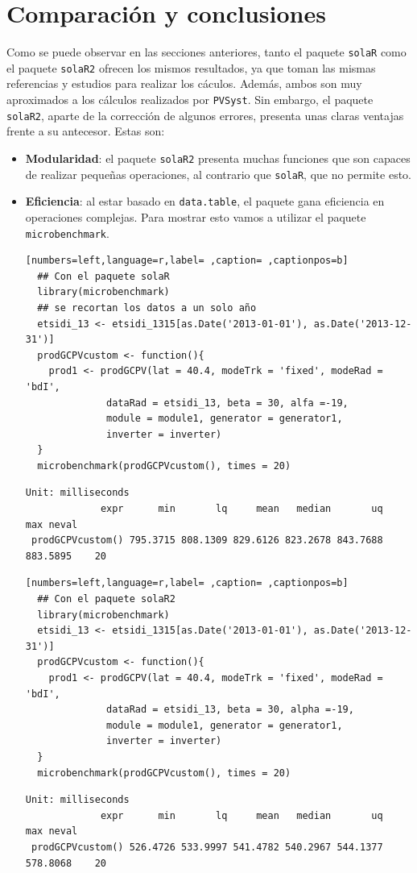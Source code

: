 \section{Comparación y conclusiones}
\label{sec:orgec06447}
\label{sec:comparacion-conclusiones}
Como se puede observar en las secciones anteriores, tanto el paquete \texttt{solaR} como el paquete \texttt{solaR2} ofrecen los mismos resultados, ya que toman las mismas referencias y estudios para realizar los cáculos. Además, ambos son muy aproximados a los cálculos realizados por \texttt{PVSyst}. Sin embargo, el paquete \texttt{solaR2}, aparte de la corrección de algunos errores, presenta unas claras ventajas frente a su antecesor. Estas son:
\begin{itemize}
\item \textbf{Modularidad}: el paquete \texttt{solaR2} presenta muchas funciones que son capaces de realizar pequeñas operaciones, al contrario que \texttt{solaR}, que no permite esto.
\item \textbf{Eficiencia}: al estar basado en \texttt{data.table}, el paquete gana eficiencia en operaciones complejas. Para mostrar esto vamos a utilizar el paquete \texttt{microbenchmark}.
\begin{lstlisting}[numbers=left,language=r,label= ,caption= ,captionpos=b]
  ## Con el paquete solaR
  library(microbenchmark)
  ## se recortan los datos a un solo año
  etsidi_13 <- etsidi_1315[as.Date('2013-01-01'), as.Date('2013-12-31')]
  prodGCPVcustom <- function(){  
    prod1 <- prodGCPV(lat = 40.4, modeTrk = 'fixed', modeRad = 'bdI',
		      dataRad = etsidi_13, beta = 30, alfa =-19,
		      module = module1, generator = generator1,
		      inverter = inverter)
  }
  microbenchmark(prodGCPVcustom(), times = 20)
\end{lstlisting}

\begin{verbatim}
Unit: milliseconds
             expr      min       lq     mean   median       uq      max neval
 prodGCPVcustom() 795.3715 808.1309 829.6126 823.2678 843.7688 883.5895    20
\end{verbatim}


\begin{lstlisting}[numbers=left,language=r,label= ,caption= ,captionpos=b]
  ## Con el paquete solaR2
  library(microbenchmark)
  etsidi_13 <- etsidi_1315[as.Date('2013-01-01'), as.Date('2013-12-31')]
  prodGCPVcustom <- function(){  
    prod1 <- prodGCPV(lat = 40.4, modeTrk = 'fixed', modeRad = 'bdI',
		      dataRad = etsidi_13, beta = 30, alpha =-19,
		      module = module1, generator = generator1,
		      inverter = inverter)
  }
  microbenchmark(prodGCPVcustom(), times = 20)
\end{lstlisting}

\begin{verbatim}
Unit: milliseconds
             expr      min       lq     mean   median       uq      max neval
 prodGCPVcustom() 526.4726 533.9997 541.4782 540.2967 544.1377 578.8068    20
\end{verbatim}
\end{itemize}

